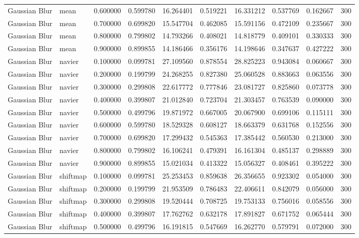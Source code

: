\begin{table}[h]
\begin{tabular}{llrrrrrrrr}
Gaussian Blur & mean & 0.600000 & 0.599780 & 16.264401 & 0.519221 & 16.331212 & 0.537769 & 0.162667 & 300 \\
Gaussian Blur & mean & 0.700000 & 0.699820 & 15.547704 & 0.462085 & 15.591156 & 0.472109 & 0.235667 & 300 \\
Gaussian Blur & mean & 0.800000 & 0.799802 & 14.793266 & 0.408021 & 14.818779 & 0.409101 & 0.330333 & 300 \\
Gaussian Blur & mean & 0.900000 & 0.899855 & 14.186466 & 0.356176 & 14.198646 & 0.347637 & 0.427222 & 300 \\
Gaussian Blur & navier & 0.100000 & 0.099781 & 27.109560 & 0.878554 & 28.825223 & 0.943084 & 0.060667 & 300 \\
Gaussian Blur & navier & 0.200000 & 0.199799 & 24.268255 & 0.827380 & 25.060528 & 0.883663 & 0.063556 & 300 \\
Gaussian Blur & navier & 0.300000 & 0.299808 & 22.617772 & 0.777846 & 23.081727 & 0.825860 & 0.073778 & 300 \\
Gaussian Blur & navier & 0.400000 & 0.399807 & 21.012840 & 0.723704 & 21.303457 & 0.763539 & 0.090000 & 300 \\
Gaussian Blur & navier & 0.500000 & 0.499796 & 19.871972 & 0.667005 & 20.067900 & 0.699106 & 0.115111 & 300 \\
Gaussian Blur & navier & 0.600000 & 0.599780 & 18.529328 & 0.608127 & 18.663379 & 0.631768 & 0.152556 & 300 \\
Gaussian Blur & navier & 0.700000 & 0.699820 & 17.299432 & 0.545363 & 17.385442 & 0.560530 & 0.213000 & 300 \\
Gaussian Blur & navier & 0.800000 & 0.799802 & 16.106241 & 0.479391 & 16.161304 & 0.485137 & 0.298889 & 300 \\
Gaussian Blur & navier & 0.900000 & 0.899855 & 15.021034 & 0.413322 & 15.056327 & 0.408461 & 0.395222 & 300 \\
Gaussian Blur & shiftmap & 0.100000 & 0.099781 & 25.253453 & 0.859638 & 26.356655 & 0.923302 & 0.054000 & 300 \\
Gaussian Blur & shiftmap & 0.200000 & 0.199799 & 21.953509 & 0.786483 & 22.406611 & 0.842079 & 0.056000 & 300 \\
Gaussian Blur & shiftmap & 0.300000 & 0.299808 & 19.520444 & 0.708725 & 19.753133 & 0.756016 & 0.058556 & 300 \\
Gaussian Blur & shiftmap & 0.400000 & 0.399807 & 17.762762 & 0.632178 & 17.891827 & 0.671752 & 0.065444 & 300 \\
Gaussian Blur & shiftmap & 0.500000 & 0.499796 & 16.191815 & 0.547669 & 16.262770 & 0.579791 & 0.072000 & 300 \\

\end{tabular}
\end{table}
